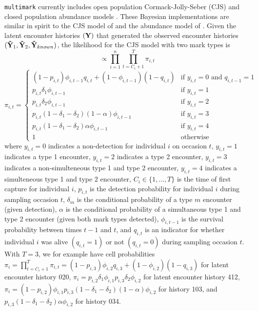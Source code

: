 \documentclass[12pt]{article}
\begin{document}
\verb|multimark| currently includes open population Cormack-Jolly-Seber (CJS) and closed population abundance models \citep[e.g.][]{WilliamsEtAl2002}. These Bayesian implementations are similar in spirit to the CJS model of \cite{Royle2008} and the abundance model of \cite{KingEtAl2015}. Given the latent encounter histories $({\bf Y})$ that generated the observed encounter histories $({\bf {\tilde Y}}_1, {\bf {\tilde Y}}_2, {\bf {\tilde Y}}_{known})$, the likelihood for the CJS model with two mark types is
\begin{equation}
  [ {\bf Y} \mid {\bf p}, {\boldsymbol \delta}, \alpha, \boldsymbol{\phi}, {\bf Q}] \propto \prod_{i=1}^{n} \prod_{t=C_i+1}^T \pi_{i,t}
  \label{eq:CJSlike}
\end{equation}
\begin{equation*}
  \pi_{i,t} = \begin{cases}
                \left( 1-p_{i,t} \right) \phi_{i,t-1} q_{i,t} + \left( 1-\phi_{i,t-1} \right) \left( 1- q_{i,t} \right)  & \text{if } y_{i,t}=0 \text{ and } q_{i,t-1}=1\\
                p_{i,t} \delta_1 \phi_{i,t-1}  & \text{if } y_{i,t}=1\\
                p_{i,t} \delta_2 \phi_{i,t-1}  & \text{if } y_{i,t}=2\\
                p_{i,t} \left( 1 - \delta_1 - \delta_2 \right) \left( 1 - \alpha \right) \phi_{i,t-1}  & \text{if } y_{i,t}=3\\
                p_{i,t} \left( 1 - \delta_1 - \delta_2 \right) \alpha \phi_{i,t-1}  & \text{if } y_{i,t}=4\\
                1 & \text{otherwise}
              \end{cases}
\end{equation*}
where $y_{i,t}=0$ indicates a non-detection for individual $i$ on occasion $t$, $y_{i,t}=1$ indicates a type 1 encounter, $y_{i,t}=2$ indicates a type 2 encounter, $y_{i,t}=3$ indicates a non-simulteneous type 1 and type 2 encounter, $y_{i,t}=4$ indicates a simulteneous type 1 and type 2 encounter, $C_i \in \{ 1,\ldots,T \}$ is the time of first capture for individual $i$, $p_{i,t}$ is the detection probability for individual $i$ during sampling occasion $t$, $\delta_m$ is the conditional probability of a type $m$ encounter (given detection), $\alpha$ is the conditional probability of a simultaneous type 1 and type 2 encounter (given both mark types detected), $\phi_{i,t-1}$ is the survival probability between times $t-1$ and $t$, and $q_{i,t}$ is an indicator for whether individual $i$ was alive $(q_{i,t}=1)$ or not $(q_{i,t}=0)$ during sampling occasion $t$. With $T=3$, we for example have cell probabilities $\pi_i= \prod_{t=C_i+1}^T \pi_{i,t} = \left(1-p_{i,3}\right) \phi_{i,2} q_{i,3} + \left(1- \phi_{i,2}\right)\left(1-q_{i,3}\right)$ for latent encounter history 020, $\pi_i= p_{i,2} \delta_1 \phi_{i,1} p_{i,3} \delta_2 \phi_{i,2}$ for latent encounter history 412, $\pi_i=\left(1-p_{i,2}\right) \phi_{i,1} p_{i,3} \left(1-\delta_1-\delta_2\right) \left(1-\alpha\right) \phi_{i,2}$ for history 103, and $p_{i,3} \left(1-\delta_1-\delta_2\right) \alpha \phi_{i,2}$ for history 034.
\end{document}

